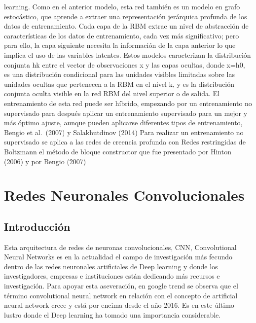 \documentclass[
  a4paper,
  DIV=11,
  numbers=noendperiod]{scrreprt}
\begin{document}
learning. Como en el anterior modelo, esta red también es un modelo en
grafo estocástico, que aprende a extraer una representación jerárquica
profunda de los datos de entrenamiento. Cada capa de la RBM extrae un
nivel de abstracción de características de los datos de entrenamiento,
cada vez más significativo; pero para ello, la capa siguiente necesita
la información de la capa anterior lo que implica el uso de las
variables latentes. Estos modelos caracterizan la distribución conjunta
hk entre el vector de observaciones x y las capas ocultas, donde x=h0,
es una distribución condicional para las unidades visibles limitadas
sobre las unidades ocultas que pertenecen a la RBM en el nivel k, y es
la distribución conjunta oculta visible en la red RBM del nivel superior
o de salida. El entrenamiento de esta red puede ser híbrido, empezando
por un entrenamiento no supervisado para después aplicar un
entrenamiento supervisado para un mejor y más óptimo ajuste, aunque
pueden aplicarse diferentes tipos de entrenamiento, Bengio et al.~(2007)
y Salakhutdinov (2014) Para realizar un entrenamiento no supervisado se
aplica a las redes de creencia profunda con Redes restringidas de
Boltzmann el método de bloque constructor que fue presentado por Hinton
(2006) y por Bengio (2007)

\hypertarget{redes-neuronales-convolucionales}{%
\section{Redes Neuronales
Convolucionales}\label{redes-neuronales-convolucionales}}

\hypertarget{introducciuxf3n-2}{%
\subsection{Introducción}\label{introducciuxf3n-2}}

Esta arquitectura de redes de neuronas convolucionales, CNN,
Convolutional Neural Networks es en la actualidad el campo de
investigación más fecundo dentro de las redes neuronales artificiales de
Deep learning y donde los investigadores, empresas e instituciones están
dedicando más recursos e investigación. Para apoyar esta aseveración, en
google trend se observa que el término convolutional neural network en
relación con el concepto de artificial neural network crece y está por
encima desde el año 2016. Es en este último lustro donde el Deep
learning ha tomado una importancia considerable.
\end{document}
